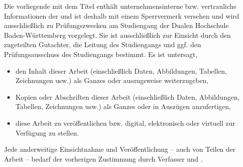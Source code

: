 Die vorliegende \sDocumentTypePhrase{} mit dem Titel \emph{\documentTitle}
enthält unternehmensinterne bzw. vertrauliche Informationen der 
\companyName{} und ist deshalb mit einem Sperrvermerk versehen und wird
ausschließlich zu Prüfungszwecken am Studiengang \department{} der Dualen
Hochschule Baden-Württemberg {\locationUniversity} vorgelegt.
Sie ist ausschließlich zur Einsicht durch den zugeteilten Gutachter, die
Leitung des Studiengangs und ggf. den Prüfungsausschuss des Studiengangs 
bestimmt.
Es ist untersagt,

\begin{itemize}
    \item den Inhalt dieser Arbeit (einschließlich Daten, Abbildungen, 
    Tabellen, Zeichnungen usw.) als Ganzes oder auszugsweise weiterzugeben,
    \item Kopien oder Abschriften dieser Arbeit (einschließlich Daten,
    Abbildungen, Tabellen, Zeichnungen usw.) als Ganzes oder in Auszügen
    anzufertigen,
    \item diese Arbeit zu veröffentlichen bzw. digital, elektronisch oder
    virtuell zur Verfügung zu stellen.
\end{itemize}

Jede anderweitige Einsichtnahme und Veröffentlichung -- auch von Teilen der
Arbeit -- bedarf der vorherigen Zustimmung durch
 Verfasser und \companyName{}.